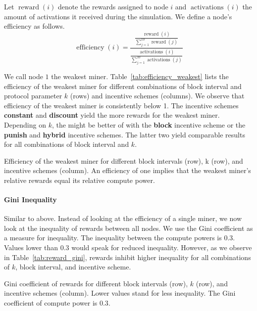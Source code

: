 \documentclass{article}
\begin{document}
Let $\operatorname{reward}(i)$ denote the rewards assigned to node $i$ and $\operatorname{activations}(i)$ the amount of activations it received during the simulation.
We define a node's efficiency as follows.
\[
  \operatorname{efficiency}(i) =
  \frac{
    \frac{\operatorname{reward}(i)}{\sum_{j=1}^{10}{\operatorname{reward}(j)}}
    }{
    \frac{\operatorname{activations}(i)}{\sum_{j=1}^{10}{\operatorname{activations}(j)}}
  }
\]

We call node $1$ the weakest miner.
Table~\ref{tab:efficiency_weakest} lists the efficiency of the weakest miner for different combinations of block interval and protocol parameter $k$ (rows) and incentive schemes (columns). We observe that efficiency of the weakest miner is consistently below 1. The incentive schemes \textbf{constant} and \textbf{discount} yield the more rewards for the weakest miner. Depending on $k$, the might be better of with the \textbf{block} incentive scheme or the \textbf{punish} and \textbf{hybrid} incentive schemes. The latter two yield comparable results for all combinations of block interval and $k$.

\begin{table}
  \caption{Efficiency of the weakest miner for different block intervals (row), k (row), and incentive schemes (column). An efficiency of one implies that the weakest miner's relative rewards equal its relative compute power.}
  \label{tab:efficiency_weakest}
  
\end{table}

\paragraph{Gini Inequality}

Similar to above.
Instead of looking at the efficiency of a single miner, we now look at the inequality of rewards between all nodes.
We use the Gini coefficient as a measure for inequality.
The inequality between the compute powers is 0.3.
Values lower than 0.3 would speak for reduced inequality.
However, as we observe in Table~\ref{tab:reward_gini}, rewards inhibit higher inequality for all combinations of $k$, block interval, and incentive scheme.

\begin{table}
  \caption{Gini coefficient of rewards for different block intervals (row), $k$ (row), and incentive schemes (column).
  Lower values stand for less inequality. The Gini coefficient of compute power is $0.3$.}
  \label{tab:reward_gini}
  
\end{table}
\end{document}
